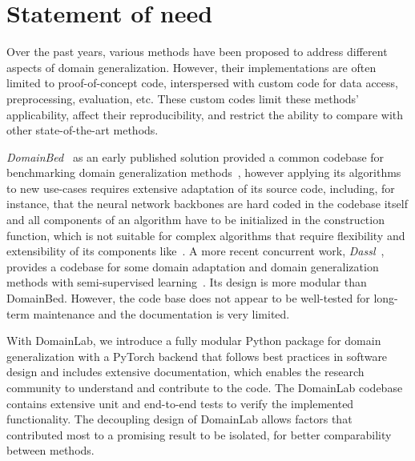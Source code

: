 \section{Statement of need}\label{statement-of-need}
Over the past years, various methods have been proposed to address
different aspects of domain generalization. However, their
implementations are often limited to proof-of-concept code, interspersed
with custom code for data access, preprocessing, evaluation, etc. These
custom codes limit these methods' applicability, affect their
reproducibility, and restrict the ability to compare with other
state-of-the-art methods.

\emph{DomainBed}~\cite{domainbed2022github} as an early published solution provided a common codebase for benchmarking domain generalization methods~\cite{gulrajani2020search}, however applying its algorithms to new use-cases requires extensive adaptation of its source code, including, for instance, that the neural network backbones are hard coded in the codebase itself and all components of an algorithm have to be initialized in the construction function, which is not suitable for complex algorithms that require flexibility and extensibility of its components like~\cite{mahajan2021domain, sun2021hierarchical}.
A more recent concurrent work, \emph{Dassl}~\cite{dassl2022github}, provides a codebase for some domain adaptation and domain generalization methods with semi-supervised learning~\cite{zhou2021domain}.
Its design is more modular than DomainBed. However, the code base does
not appear to be well-tested for long-term maintenance and the
documentation is very limited.

With DomainLab, we introduce a fully modular Python package for domain
generalization with a PyTorch backend that follows best practices in
software design and includes extensive documentation, which enables the
research community to understand and contribute to the code. The
DomainLab codebase contains extensive unit and end-to-end tests to
verify the implemented functionality. The decoupling design of DomainLab
allows factors that contributed most to a promising result to be
isolated, for better comparability between methods.
